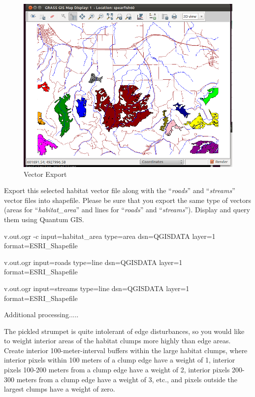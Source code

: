 \begin{figure}[htbp]
   \centering
   \includegraphics[scale=0.35]{grass024.png}
   \caption{Vector Export}
   \label{fig:grass024}
\end{figure}

Export this selected habitat vector file along with the ``\textit{roads}'' and ``\textit{streams}'' vector files into shapefile. Please be sure that you export the same type of vectors (areas for ``\textit{habitat\_area}'' and lines for ``\textit{roads}'' and ``\textit{streams}''). Display and query them using Quantum GIS.

\begin{smallverbatim}
v.out.ogr -c input=habitat_area type=area
 dsn=QGISDATA layer=1 format=ESRI_Shapefile

v.out.ogr input=roads type=line dsn=QGISDATA
 layer=1 format=ESRI_Shapefile

v.out.ogr input=streams type=line dsn=QGISDATA
 layer=1 format=ESRI_Shapefile
\end{smallverbatim}

Additional processing.....

The pickled strumpet is quite intolerant of edge disturbances, so you would like to weight interior areas of the habitat clumps more highly than edge areas. Create interior 100-meter-interval buffers within the large habitat clumps, where interior pixels within 100 meters of a clump edge have a weight of 1, interior pixels 100-200 meters from a clump edge have a weight of 2, interior pixels 200-300 meters from a clump edge have a weight of 3, etc., and pixels outside the largest clumps have a weight of zero.

